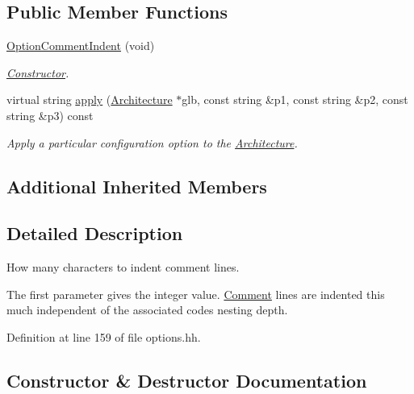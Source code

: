 \subsection*{Public Member Functions}
\begin{DoxyCompactItemize}
\item 
\mbox{\hyperlink{class_option_comment_indent_af606c439468e39d90a410eeaa525a8d8}{Option\+Comment\+Indent}} (void)
\begin{DoxyCompactList}\small\item\em \mbox{\hyperlink{class_constructor}{Constructor}}. \end{DoxyCompactList}\item 
virtual string \mbox{\hyperlink{class_option_comment_indent_a1bbaa0f6aea68d413ce9d4c581f71792}{apply}} (\mbox{\hyperlink{class_architecture}{Architecture}} $\ast$glb, const string \&p1, const string \&p2, const string \&p3) const
\begin{DoxyCompactList}\small\item\em Apply a particular configuration option to the \mbox{\hyperlink{class_architecture}{Architecture}}. \end{DoxyCompactList}\end{DoxyCompactItemize}
\subsection*{Additional Inherited Members}


\subsection{Detailed Description}
How many characters to indent comment lines. 

The first parameter gives the integer value. \mbox{\hyperlink{class_comment}{Comment}} lines are indented this much independent of the associated code\textquotesingle{}s nesting depth. 

Definition at line 159 of file options.\+hh.



\subsection{Constructor \& Destructor Documentation}
\mbox{\label{class_option_comment_indent_af606c439468e39d90a410eeaa525a8d8}} 
